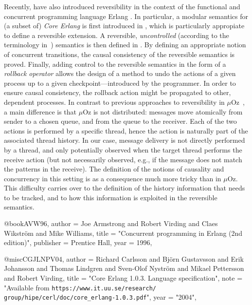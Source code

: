 % 

Recently, \cite{NPV16,LNPV17} have also introduced reversibility in the
context of the functional and concurrent programming language Erlang
\cite{AVW96}. In particular, a modular semantics for (a subset of)
\emph{Core Erlang} \cite{CGJLNPV04} is first introduced in
\cite{NPV16}, which is particularly appropiate to define a reversible
extension. A reversible, \emph{uncontrolled} (according to the
terminology in~\cite{LMT14}) semantics is then defined in
\cite{LNPV17}. By defining an appropriate notion of concurrent
transitions, the causal consistency of the reversible semantics is
proved. Finally, adding control to the reversible semantics in the
form of a \emph{rollback operator} allows the design of a method to
undo the actions of a given process up to a given
checkpoint---introduced by the programmer. In order to ensure
causal consistency, the rollback action might be propagated to other,
dependent processes.
%
In contrast to previous approaches to reversibility in
$\mu$Oz~\cite{LLMS12,GLM14}, a main difference is that $\mu$Oz is not
distributed: messages move atomically from sender to a chosen queue,
and from the queue to the receiver. Each of the two actions is
performed by a specific thread, hence the action is naturally part of
the associated thread history. In our case, message delivery is not
directly performed by a thread, and only potentially observed when the
target thread performs the receive action (but not necessarily
observed, e.g., if the message does not match the patterns in the
receive). The definition of the notions of causality and concurrency
in this setting is as a consequence much more tricky than in
$\mu$Oz. This difficulty carries over to the definition of the history
information that needs to be tracked, and to how this information is
exploited in the reversible semantics.

%



@book{AVW96,
  author = {Joe Armstrong and Robert Virding and Claes Wikstr{\"{o}}m and Mike Williams},
  title     = "{Concurrent programming in Erlang (2nd edition)}",
  publisher = {Prentice Hall},
  year      = {1996},
}

@misc{CGJLNPV04,
  author = {Richard Carlsson and Bj{\"{o}}rn Gustavsson and Erik Johansson and Thomas Lindgren and Sven-Olof Nystr\"om and Mikael Pettersson and Robert Virding},
  title = "Core Erlang 1.0.3. Language specification",
  note = "Available from \verb$https://www.it.uu.se/research/$ \verb$group/hipe/cerl/doc/core_erlang-1.0.3.pdf$",
  year = "2004",
}

